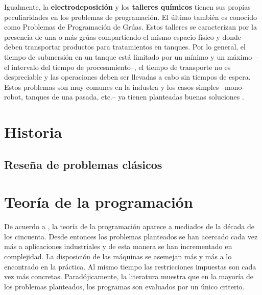 \documentclass[draft,12pt,headsepline,footsepline,paper=letter]{scrreprt}
\begin{document}
Igualmente, la \textbf{electrodeposición} y los \textbf{talleres químicos} tienen sus propias peculiaridades en los problemas de programación. El último también es conocido como Problemas de Programación de Grúas. Estos talleres se caracterizan por la presencia de una o más grúas compartiendo el mismo espacio físico y donde deben transportar productos para tratamientos en tanques. Por lo general, el tiempo de submersión en un tanque está limitado por un mínimo y un máximo –el intervalo del tiempo de procesamiento–, el tiempo de transporte no es despreciable y las operaciones deben ser llevadas a cabo sin tiempos de espera. Estos problemas son muy comunes en la industra y los casos simples –mono-robot, tanques de una pasada, etc.– ya tienen planteadas buenas soluciones \citep[p.~6,~7]{TKindt2002}.


\section{Historia}
\label{historia_programación}

\subsection{Reseña de problemas clásicos}
\label{resena_problemas_clasicos}

\section{Teoría de la programación}
\label{teoria_programacion}

De acuerdo a \citet[p.~1]{TKindt2002}, la teoría de la programación aparece a mediados de la década de los cincuenta. Desde entonces los problemas planteados se han acercado cada vez más a aplicaciones industriales y de esta manera se han incrementado en complejidad. La disposición de las máquinas se asemejan más y más a lo encontrado en la práctica. Al mismo tiempo las restricciones impuestas son cada vez más concretas.  Paradójicamente, la literatura muestra que en la mayoría de los problemas planteados, los programas son evaluados por un único criterio. 
\end{document}
